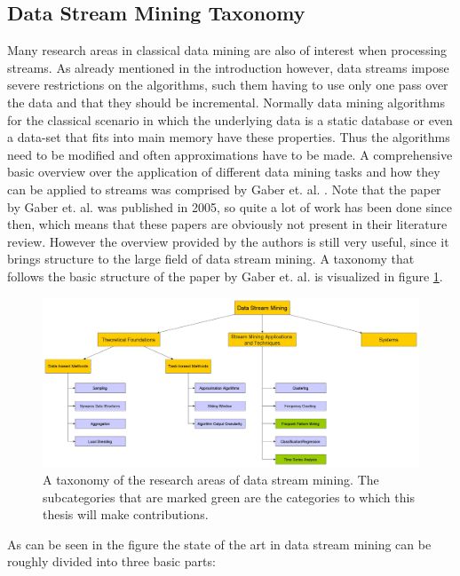 \subsection{Data Stream Mining Taxonomy}
\label{subsec_dataStreamMiningTaxonomy}
Many research areas in classical data mining are also of interest when processing streams. As already mentioned in the introduction however, data streams impose severe restrictions on the algorithms, such them having to use only one pass over the data and that they should be incremental. Normally data mining algorithms for the classical scenario in which the underlying data is a static database or even a data-set that fits into main memory have these properties. Thus the algorithms need to be modified and often approximations have to be made. A comprehensive basic overview over the application of different data mining tasks and how they can be applied to streams was comprised by Gaber et. al. \cite{gaber2005mining}. Note that the paper by Gaber et. al. was published in 2005, so quite a lot of work has been done since then, which means that these papers are obviously not present in their literature review. However the overview provided by the authors is still very useful, since it brings structure to the large field of data stream mining. A taxonomy that follows the basic structure of the paper by Gaber et. al. is visualized in figure \ref{fig_streamMiningTaxonomy}.

\begin{figure}[h]
	\centering
  	\includegraphics[width=\textwidth]{streamMiningTaxonomy}
	\caption{A taxonomy of the research areas of data stream mining. The subcategories that are marked green are the categories to which this thesis will make contributions.}
	\label{fig_streamMiningTaxonomy}
\end{figure}

As can be seen in the figure the state of the art in data stream mining can be roughly divided into three basic parts:

